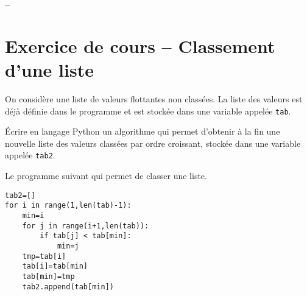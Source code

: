





\begin{center}
{\Large\bf {\type} \no {\num} -- \descrip}
\end{center}


\section{Exercice de cours -- Classement d'une liste}

On considère une liste de valeurs flottantes non classées. La liste des valeurs est déjà définie dans le programme et est stockée dans une variable appelée \texttt{tab}.

Écrire en langage Python un algorithme qui permet d'obtenir à la fin une nouvelle liste des valeurs classées par ordre croissant, stockée dans une variable appelée \texttt{tab2}.

Le programme suivant qui permet de classer une liste.
\begin{verbatim}
tab2=[]
for i in range(1,len(tab)-1):
    min=i
    for j in range(i+1,len(tab)):
        if tab[j] < tab[min]:
            min=j
    tmp=tab[i]
    tab[i]=tab[min]
    tab[min]=tmp
    tab2.append(tab[min])
\end{verbatim}


